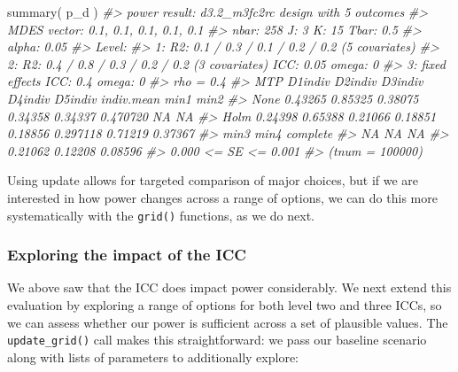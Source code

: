 \documentclass{article}
\newenvironment{Shaded}{\begin{snugshade}}{\end{snugshade}}
\newcommand{\CommentTok}[1]{\textcolor[rgb]{0.56,0.35,0.01}{\textit{#1}}}
\newcommand{\FunctionTok}[1]{\textcolor[rgb]{0.00,0.00,0.00}{#1}}
\newcommand{\NormalTok}[1]{#1}
\begin{document}
\begin{Shaded}
\begin{Highlighting}[]
\FunctionTok{summary}\NormalTok{( p\_d )}
\CommentTok{\#\textgreater{} power result: d3.2\_m3fc2rc design with 5 outcomes}
\CommentTok{\#\textgreater{}   MDES vector: 0.1, 0.1, 0.1, 0.1, 0.1}
\CommentTok{\#\textgreater{}   nbar: 258  J: 3    K: 15   Tbar: 0.5}
\CommentTok{\#\textgreater{}   alpha: 0.05    }
\CommentTok{\#\textgreater{}   Level:}
\CommentTok{\#\textgreater{}     1: R2: 0.1 / 0.3 / 0.1 / 0.2 / 0.2 (5 covariates)}
\CommentTok{\#\textgreater{}     2: R2: 0.4 / 0.8 / 0.3 / 0.2 / 0.2 (3 covariates)    ICC: 0.05   omega: 0}
\CommentTok{\#\textgreater{}     3:   fixed effects   ICC: 0.4    omega: 0}
\CommentTok{\#\textgreater{}   rho = 0.4}
\CommentTok{\#\textgreater{}   MTP D1indiv D2indiv D3indiv D4indiv D5indiv indiv.mean    min1    min2}
\CommentTok{\#\textgreater{}  None 0.43265 0.85325 0.38075 0.34358 0.34337   0.470720      NA      NA}
\CommentTok{\#\textgreater{}  Holm 0.24398 0.65388 0.21066 0.18851 0.18856   0.297118 0.71219 0.37367}
\CommentTok{\#\textgreater{}     min3    min4 complete}
\CommentTok{\#\textgreater{}       NA      NA       NA}
\CommentTok{\#\textgreater{}  0.21062 0.12208  0.08596}
\CommentTok{\#\textgreater{}  0.000 \textless{}= SE \textless{}= 0.001}
\CommentTok{\#\textgreater{}  (tnum = 100000)}
\end{Highlighting}
\end{Shaded}

Using update allows for targeted comparison of major choices, but if we
are interested in how power changes across a range of options, we can do
this more systematically with the \texttt{grid()} functions, as we do
next.

\subsubsection{Exploring the impact of the ICC}

We above saw that the ICC does impact power considerably. We next extend
this evaluation by exploring a range of options for both level two and
three ICCs, so we can assess whether our power is sufficient across a
set of plausible values. The \texttt{update\_grid()} call makes this
straightforward: we pass our baseline scenario along with lists of
parameters to additionally explore:
\end{document}
